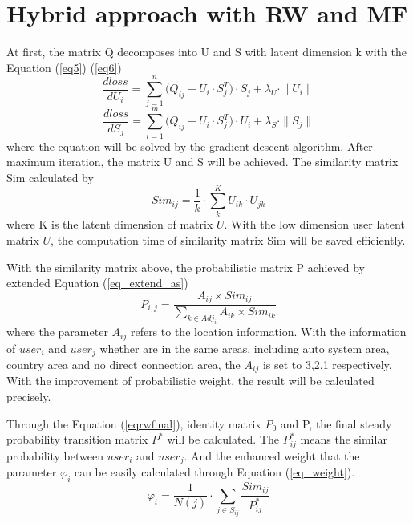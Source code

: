 \documentclass[conference]{IEEEtran}
\begin{document}
\section{Hybrid approach with RW and MF}\label{S-HRWMF}
\par At first, the matrix Q decomposes into U and S with latent dimension k with the Equation (\ref{eq5}) (\ref{eq6})
\begin{equation}
{\frac{dloss}{dU_{i}}={\sum_{j=1}^{n}{
(Q_{ij}-U_{i} \cdot S_{j}^{T}}) \cdot S_{j}
} 
+ \lambda_{U} \cdot \|U_{i}\|
\label{eq5}
} 
\end{equation}
\begin{equation}
\frac{dloss}{dS_{j}}={\sum_{i=1}^{m}{
(Q_{ij}-U_{i} \cdot S_{j}^{T}}) \cdot U_{i}
}
+ \lambda_{S} \cdot \|S_{j}\|
\label{eq6}
\end{equation}
where the equation will be solved by the gradient descent algorithm.
After maximum iteration, the matrix U and S will be achieved. The similarity matrix Sim calculated by 
\begin{equation}
Sim_{ij}=\frac{1}{k} \cdot \sum_{k}^{K}U_{ik} \cdot U_{jk}
\end{equation}
where K is the latent dimension of matrix $U$. With the low dimension user latent matrix $U$, the computation time of similarity matrix Sim will be saved efficiently.
\par With the similarity matrix above, the probabilistic matrix P achieved by extended Equation (\ref{eq_extend_as})
\begin{equation}
P_{i,j}=\frac{A_{ij} \times Sim_{ij}}{\sum_{k \in Adj_{i}}{A_{ik} \times Sim_{ik}}}
\label{eq_extend_as}
\end{equation}
where the parameter $A_{ij}$ refers to the location information. With the information of $user_{i}$ and $user_{j}$ whether are in the same areas, including auto system area, country area and no direct connection area, the $A_{ij}$ is set to 3,2,1 respectively. With the improvement of probabilistic weight, the result will be calculated precisely.
\par Through the Equation (\ref{eqrwfinal}), identity matrix $P_{0}$ and P, the final steady probability transition matrix $P^{*}$ will be calculated. The $P^{*}_{ij}$ means the similar probability between $user_{i}$ and $user_{j}$. And the enhanced weight that the parameter $\varphi_{i}$ can be easily calculated through Equation (\ref{eq_weight}).
\begin{equation}
\varphi_{i}=\frac{1}{N(j)} \cdot \sum_{j \in S_{ij}}{\frac{Sim_{ij}}{P^{*}_{ij}}}
\label{eq_weight}
\end{equation}
\end{document}
